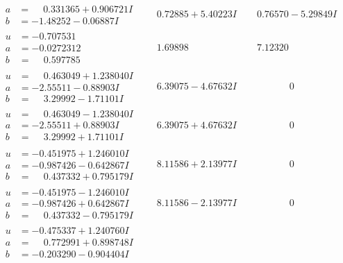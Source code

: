 \documentclass[1p]{elsarticle_modified}
\theoremstyle{definition}
\begin{document}
$$\begin{array}{c|c|c}
\begin{aligned}
a &= \phantom{-}0.331365 + 0.906721 I \\
b &= -1.48252 - 0.06887 I\end{aligned}
 & \phantom{-}0.72885 + 5.40223 I & \phantom{-}0.76570 - 5.29849 I \\ \hline\begin{aligned}
u &= -0.707531\phantom{ +0.000000I} \\
a &= -0.0272312\phantom{ +0.000000I} \\
b &= \phantom{-}0.597785\phantom{ +0.000000I}\end{aligned}
 & \phantom{-}1.69898\phantom{ +0.000000I} & \phantom{-}7.12320\phantom{ +0.000000I} \\ \hline\begin{aligned}
u &= \phantom{-}0.463049 + 1.238040 I \\
a &= -2.55511 - 0.88903 I \\
b &= \phantom{-}3.29992 - 1.71101 I\end{aligned}
 & \phantom{-}6.39075 - 4.67632 I & \phantom{-0.000000 } 0 \\ \hline\begin{aligned}
u &= \phantom{-}0.463049 - 1.238040 I \\
a &= -2.55511 + 0.88903 I \\
b &= \phantom{-}3.29992 + 1.71101 I\end{aligned}
 & \phantom{-}6.39075 + 4.67632 I & \phantom{-0.000000 } 0 \\ \hline\begin{aligned}
u &= -0.451975 + 1.246010 I \\
a &= -0.987426 - 0.642867 I \\
b &= \phantom{-}0.437332 + 0.795179 I\end{aligned}
 & \phantom{-}8.11586 + 2.13977 I & \phantom{-0.000000 } 0 \\ \hline\begin{aligned}
u &= -0.451975 - 1.246010 I \\
a &= -0.987426 + 0.642867 I \\
b &= \phantom{-}0.437332 - 0.795179 I\end{aligned}
 & \phantom{-}8.11586 - 2.13977 I & \phantom{-0.000000 } 0 \\ \hline\begin{aligned}
u &= -0.475337 + 1.240760 I \\
a &= \phantom{-}0.772991 + 0.898748 I \\
b &= -0.203290 - 0.904404 I\end{aligned}

\end{array}$$
\end{document}
